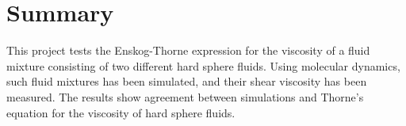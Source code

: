\chapter{Summary}
This project tests the Enskog-Thorne expression for the viscosity
of a fluid mixture consisting of two different hard sphere fluids. 
Using molecular dynamics, such fluid mixtures has been simulated, 
and their shear viscosity has been measured. The results show 
agreement between simulations and Thorne's equation for the 
viscosity of hard sphere fluids.




